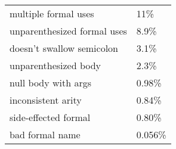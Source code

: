 \begin{tabular}{|l|l|} \hline
multiple formal uses & 11\% \\ 
unparenthesized formal uses & 8.9\% \\ 
doesn't swallow semicolon & 3.1\% \\ 
unparenthesized body & 2.3\% \\ 
null body with args & 0.98\% \\ 
inconsistent arity & 0.84\% \\ 
side-effected formal & 0.80\% \\ 
bad formal name & 0.056\% \\ 
\hline
\end{tabular}
